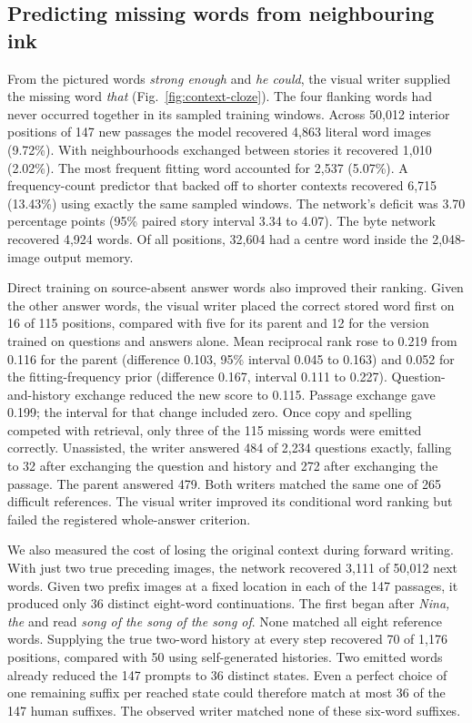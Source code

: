 \documentclass[12pt,a4paper]{article}
\providecommand{\DIFadd}[1]{{\protect\color{blue} \sf #1}} %
\begin{document}
\subsection*{\DIFadd{Predicting missing words from neighbouring ink}}
\DIFadd{From the pictured words \emph{strong enough} and \emph{he could}, the visual writer supplied the missing word \emph{that} (Fig.~\ref{fig:context-cloze}). The four flanking words had never occurred together in its sampled training windows. Across 50,012 interior positions of 147 new passages the model recovered 4,863 literal word images (9.72\%). With neighbourhoods exchanged between stories it recovered 1,010 (2.02\%). The most frequent fitting word accounted for 2,537 (5.07\%). A frequency-count predictor that backed off to shorter contexts recovered 6,715 (13.43\%) using exactly the same sampled windows. The network's deficit was 3.70 percentage points (95\% paired story interval 3.34 to 4.07). The byte network recovered 4,924 words. Of all positions, 32,604 had a centre word inside the 2,048-image output memory.
}

\DIFadd{Direct training on source-absent answer words also improved their ranking. Given the other answer words, the visual writer placed the correct stored word first on 16 of 115 positions, compared with five for its parent and 12 for the version trained on questions and answers alone. Mean reciprocal rank rose to 0.219 from 0.116 for the parent (difference 0.103, 95\% interval 0.045 to 0.163) and 0.052 for the fitting-frequency prior (difference 0.167, interval 0.111 to 0.227). Question-and-history exchange reduced the new score to 0.115. Passage exchange gave 0.199; the interval for that change included zero. Once copy and spelling competed with retrieval, only three of the 115 missing words were emitted correctly. Unassisted, the writer answered 484 of 2,234 questions exactly, falling to 32 after exchanging the question and history and 272 after exchanging the passage. The parent answered 479. Both writers matched the same one of 265 difficult references. The visual writer improved its conditional word ranking but failed the registered whole-answer criterion.
}

\DIFadd{We also measured the cost of losing the original context during forward writing. With just two true preceding images, the network recovered 3,111 of 50,012 next words. Given two prefix images at a fixed location in each of the 147 passages, it produced only 36 distinct eight-word continuations. The first began after \emph{Nina, the} and read \emph{song of the song of the song of}. None matched all eight reference words. Supplying the true two-word history at every step recovered 70 of 1,176 positions, compared with 50 using self-generated histories. Two emitted words already reduced the 147 prompts to 36 distinct states. Even a perfect choice of one remaining suffix per reached state could therefore match at most 36 of the 147 human suffixes. The observed writer matched none of these six-word suffixes.
}
\end{document}
